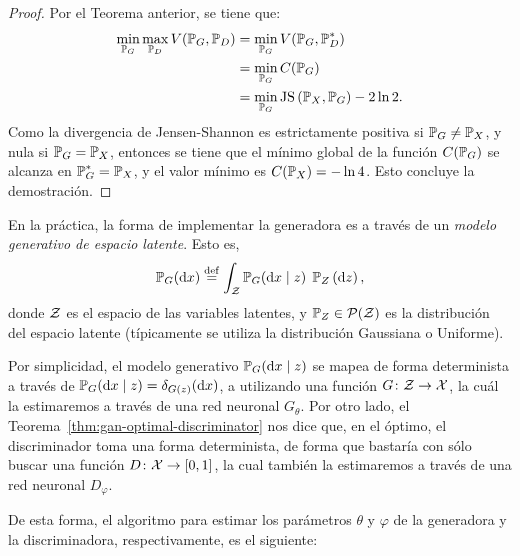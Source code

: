 {{\begin{proof}
    Por el Teorema anterior, se tiene que:
    \begin{align*}
        \min_{\Prob_G} \max_{\Prob_D} V(\Prob_G, \Prob_D)
         & = \min_{\Prob_G} V(\Prob_G, \Prob_D^\ast)         \\
         & = \min_{\Prob_G} C(\Prob_G)                       \\
         & = \min_{\Prob_G} \JS{\Prob_X}{\Prob_G} - 2 \ln 2.
    \end{align*}
    Como la divergencia de Jensen-Shannon es estrictamente positiva si $\Prob_G \neq \Prob_X$, y nula si $\Prob_G = \Prob_X$, entonces se tiene que el mínimo global de la función $C(\Prob_G)$ se alcanza en $\Prob_G^\ast = \Prob_X$, y el valor mínimo es $C(\Prob_X) = - \ln 4$. Esto concluye la demostración.
\end{proof}

En la práctica, la forma de implementar la generadora es a través de un \emph{modelo generativo de espacio latente}. Esto es,
\begin{equation}
    \Prob_G (\dd x) \eqdef \int_\cZ \Prob_G(\dd x \mid z) \; \Prob_Z \left( \dd z\right),
\end{equation}
donde $\mathcal{Z}$ es el espacio de las variables latentes, y $\Prob_Z \in \ProbSpace[\cZ] $ es la distribución del espacio latente (típicamente se utiliza la distribución Gaussiana o Uniforme).

Por simplicidad, el modelo generativo $\Prob_G (\dd x \mid z)$ se mapea de forma determinista a través de $\Prob_G (\dd x \mid z) = \delta_{G(z)}(\dd x)$, a utilizando una función $G\colon \mathcal{Z} \to \mathcal{X}$, la cuál la estimaremos a través de una red neuronal $G_\theta$. Por otro lado, el Teorema~\ref{thm:gan-optimal-discriminator} nos dice que, en el óptimo, el discriminador toma una forma determinista, de forma que bastaría con sólo buscar una función $D\colon\mathcal{X}\to [0, 1]$, la cual también la estimaremos a través de una red neuronal $D_\varphi$.

De esta forma, el algoritmo para estimar los parámetros $\theta$ y $\varphi$ de la generadora y la discriminadora, respectivamente, es el siguiente:

}}
